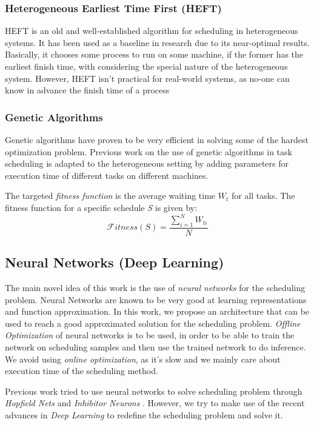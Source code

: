 \subsubsection{Heterogeneous Earliest Time First (HEFT)}
HEFT \cite{993206} is an old and well-established algorithm for scheduling in heterogeneous systems. It has been used as a baseline in research due to its near-optimal results. Basically, it chooses some process to run on some machine, if the former has the earliest finish time, with considering the special nature of the heterogeneous system. However, HEFT isn't practical for real-world systems, as no-one can know in advance the finish time of a process \\

\subsubsection{Genetic Algorithms}
Genetic algorithms \cite{article2} have proven to be very efficient in solving some of the hardest optimization problem. Previous work on the use of genetic algorithms in task scheduling \cite{article2} is adapted to the heterogeneous setting by adding parameters for execution time of different tasks on different machines.

The targeted \emph{fitness function} is the average waiting time $W_t$ for all tasks. The fitness function for a specific schedule \emph{S} is given by:
\begin{equation}
\mathcal Fitness(S) = \frac{\sum_{i=1}^{N} W_{ti}}{N} \label{eq:ga}
\end{equation}

\subsection{Neural Networks (Deep Learning)}
The main novel idea of this work is the use of \emph{neural networks} for the scheduling problem. Neural Networks are known to be very good at learning representations and function approximation. In this work, we propose an architecture that can be used to reach a good approximated solution for the scheduling problem. \emph{Offline Optimization} of neural networks is to be used, in order to be able to train the network on scheduling samples and then use the trained network to do inference. We avoid using \emph{online optimization}, as it's slow and we mainly care about execution time of the scheduling method.

Previous work tried to use neural networks to solve scheduling problem through \emph{Hopfield Nets} \cite{sathasivam2008logic} and \emph{Inhibitor Neurons} \cite{article3}. However, we try to make use of the recent advances in \emph{Deep Learning} to redefine the scheduling problem and solve it. 

